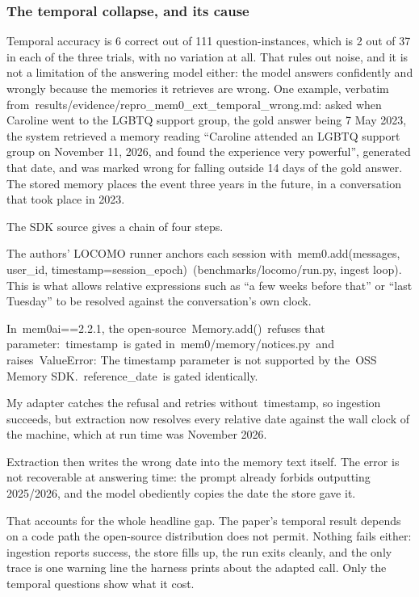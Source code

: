 \documentclass[11pt,a4paper]{article}
\begin{document}
\subsubsection{The temporal collapse, and its cause}

Temporal accuracy is 6 correct out of 111 question-instances, which is 2 out of 37 in each of the three trials, with no variation at all. That rules out noise, and it is not a limitation of the answering model either: the model answers confidently and wrongly because the memories it retrieves are wrong. One example, verbatim from~results/evidence/repro\_mem0\_ext\_temporal\_wrong.md: asked when Caroline went to the LGBTQ support group, the gold answer being 7 May 2023, the system retrieved a memory reading ``Caroline attended an LGBTQ support group on November 11, 2026, and found the experience very powerful'', generated that date, and was marked wrong for falling outside 14 days of the gold answer. The stored memory places the event three years in the future, in a conversation that took place in 2023.

The SDK source gives a chain of four steps.

The authors' LOCOMO runner anchors each session with~mem0.add(messages, user\_id, timestamp=session\_epoch)~(benchmarks/locomo/run.py, ingest loop). This is what allows relative expressions such as ``a few weeks before that'' or ``last Tuesday'' to be resolved against the conversation's own clock.

In~mem0ai==2.2.1, the open-source~Memory.add()~refuses that parameter:~timestamp~is gated in~mem0/memory/notices.py~and raises~ValueError: The timestamp parameter is not supported by the~OSS Memory SDK.~reference\_date~is gated identically.

My adapter catches the refusal and retries without~timestamp, so ingestion succeeds, but extraction now resolves every relative date against the wall clock of the machine, which at run time was November 2026.

Extraction then writes the wrong date into the memory text itself. The error is not recoverable at answering time: the prompt already forbids outputting 2025/2026, and the model obediently copies the date the store gave it.

That accounts for the whole headline gap. The paper's temporal result depends on a code path the open-source distribution does not permit. Nothing fails either: ingestion reports success, the store fills up, the run exits cleanly, and the only trace is one warning line the harness prints about the adapted call. Only the temporal questions show what it cost.
\end{document}

